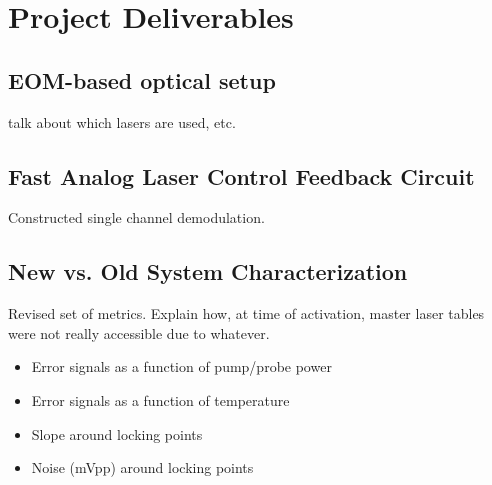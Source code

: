 \newpage
\section{Project Deliverables}

\subsection{EOM-based optical setup}

talk about which lasers are used, etc.


\subsection{Fast Analog Laser Control Feedback Circuit}

Constructed single channel demodulation.

\subsection{New vs. Old System Characterization}

Revised set of metrics. Explain how, at time of activation, master laser tables were not really accessible due to whatever.

\begin{itemize}
    \item Error signals as a function of pump/probe power
    \item Error signals as a function of temperature
    \item Slope around locking points
    \item Noise (mVpp) around locking points
\end{itemize}

